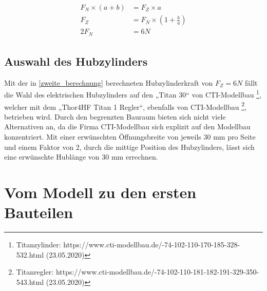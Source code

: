 \begin{eqnarray}
\label{zweite_berechnung}
\begin{split}
F_N \times(a+b) &= F_Z \times a \\
F_Z &= F_N \times (1 + \frac{b}{a}) \\
 2F_N &= 6N
\end{split}
\end{eqnarray}

\subsection{Auswahl des Hubzylinders}
Mit der in \eqref{zweite_berechnung} berechneten Hubzylinderkraft von $F_Z=6N$ fällt die Wahl des elektrischen Hubzylinders auf den „Titan 30“ von CTI-Modellbau \footnote[1]{Titanzylinder: https://www.cti-modellbau.de/-74-102-110-170-185-328-532.html (23.05.2020)}, welcher mit dem „Thor4HF Titan 1 Regler“, ebenfalls von CTI-Modellbau  \footnote[2]{Titanregler: https://www.cti-modellbau.de/-74-102-110-181-182-191-329-350-543.html (23.05.2020)}, betrieben wird. Durch den begrenzten Bauraum bieten sich nicht viele Alternativen an, da die Firma CTI-Modellbau sich explizit auf den Modellbau konzentriert.
Mit einer erwünschten Öffnungsbreite von jeweils 30 mm pro Seite und einem Faktor von 2, durch die mittige Position des Hubzylinders, lässt sich eine erwünschte Hublänge von 30 mm errechnen.

\section{Vom Modell zu den ersten Bauteilen}
